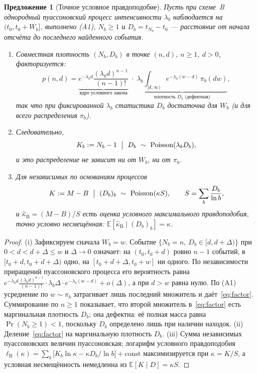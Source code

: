 \documentclass[11pt,a4paper]{article}
\theoremstyle{plain}
\newtheorem{proposition}{Предложение}
\theoremstyle{remark}
\DeclareMathOperator{\Pois}{Poisson}
\begin{document}
\begin{proposition}[Точное условное правдоподобие]\label{prop:cond}
Пусть при схеме~B однородный пуассоновский процесс интенсивности $\lambda_b$
наблюдается на $(t_0,t_0+W_b]$, выполнено (A1), $N_b\ge1$ и $D_b=t_{N_b}-t_0$ ---
расстояние от начала отсчёта до последнего найденного события.
\begin{enumerate}
\item[\rm(i)] Совместная плотность $(N_b,D_b)$ в точке $(n,d)$, $n\ge1$, $d>0$,
факторизуется:
\begin{equation}\label{eq:factor}
p(n,d)=\underbrace{e^{-\lambda_bd}\frac{(\lambda_bd)^{n-1}}{(n-1)!}}_{\text{ядро условного закона}}
\;\cdot\;
\underbrace{\lambda_b\int_{[d,\infty)}e^{-\lambda_b(w-d)}\,\pi_b(dw)}_{\text{плотность }D_b\text{ (дефектная)}},
\end{equation}
так что при фиксированной $\lambda_b$ статистика $D_b$ достаточна для $W_b$
(и для всего распределения $\pi_b$).
\item[\rm(ii)] Следовательно,
\begin{equation}\label{eq:condlaw}
K_b:=N_b-1\ \bigm|\ D_b\ \sim\ \Pois(\lambda_b D_b),
\end{equation}
и это распределение не зависит ни от $W_b$, ни от $\pi_b$.
\item[\rm(iii)] Для независимых по основаниям процессов
\begin{equation}\label{eq:pivotB}
K:=M-B\ \bigm|\ (D_b)_{b}\ \sim\ \Pois(\kappa S),\qquad
S=\sum_b\frac{D_b}{\ln b},
\end{equation}
и $\hat\kappa_{\mathrm B}=(M-B)/S$ есть оценка условного максимального
правдоподобия, точно условно несмещённая:
$\mathbb E[\hat\kappa_{\mathrm B}\mid (D_b)_b]=\kappa$.
\end{enumerate}
\end{proposition}

\begin{proof}
(i) Зафиксируем сначала $W_b=w$. Событие $\{N_b=n,\ D_b\in[d,d+\Delta)\}$ при
$0<d<d+\Delta\le w$ и $\Delta\to0$ означает: на $(t_0,t_0+d)$ ровно $n-1$
событий, в $[t_0+d,t_0+d+\Delta)$ одно, на $[t_0+d+\Delta,t_0+w]$ ни одного. По
независимости приращений пуассоновского процесса его вероятность равна
$e^{-\lambda_bd}\frac{(\lambda_bd)^{n-1}}{(n-1)!}\cdot\lambda_b\Delta\cdot
e^{-\lambda_b(w-d)}+o(\Delta)$, а при $d>w$ равна нулю. По (A1) усреднение по
$w\sim\pi_b$ затрагивает лишь последний множитель и даёт~\eqref{eq:factor}.
Суммирование по $n\ge1$ показывает, что второй множитель в~\eqref{eq:factor} есть
маргинальная плотность $D_b$; она дефектна: её полная масса равна
$\Pr(N_b\ge1)<1$, поскольку $D_b$ определено лишь при наличии находок.
(ii) Деление~\eqref{eq:factor} на маргинальную плотность $D_b$.
(iii) Сумма независимых пуассоновских величин пуассоновская; логарифм условного
правдоподобия $\ell_{\mathrm B}(\kappa)=\sum_b\bigl[K_b\ln\kappa-\kappa D_b/\ln b\bigr]
+\mathrm{const}$ максимизируется при $\kappa=K/S$, а условная несмещённость
немедленна из $\mathbb E[K\mid D]=\kappa S$.
\end{proof}
\end{document}
